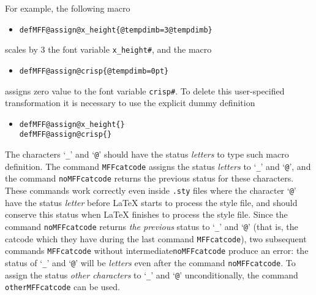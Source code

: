 For example, the following macro
\begin{itemize}
\item[] {\tt \bs{}def\bs{}MFF@assign@x\_height\{\bs{}@tempdimb=3\bs{}@tempdimb\}}
\end{itemize}
scales by 3 the font variable {\tt x\_height\#}, and the macro
\begin{itemize}
\item[] {\tt \bs{}def\bs{}MFF@assign@crisp\{\bs{}@tempdimb=0pt\}}
\end{itemize}
assigns zero value to the font variable {\tt crisp\#}.
To delete this user-specified transformation it is
necessary to use the explicit dummy definition
\begin{itemize}
\item[] {\tt \bs{}def\bs{}MFF@assign@x\_height\{\}}\\
        {\tt \bs{}def\bs{}MFF@assign@crisp\{\}}
\end{itemize}

The characters `{\tt \_}' and `{\tt @}' should have the status
{\em letters} to type such macro definition. The command
{\tt\bs{}MFFcatcode} assigns the status {\em letters} to
`{\tt \_}' and `{\tt @}', and the command {\tt\bs{}noMFFcatcode}
returns the previous status for these characters.
These commands work correctly even inside {\tt .sty} files where
the character `{\tt @}' have the status {\em letter} before \LaTeX{}
starts to process the style file, and should conserve this status
when \LaTeX{} finishes to process the style file.
Since the command {\tt\bs{}noMFFcatcode} returns {\em the previous}
status to `{\tt \_}' and `{\tt @}' (that is, the catcode which
they have during the last command {\tt\bs{}MFFcatcode}), two subsequent
commands {\tt\bs{}MFFcatcode} without intermediate{\tt\bs{}noMFFcatcode}
produce an error: the status of `{\tt \_}' and `{\tt @}' will be
{\em letters} even after the command {\tt\bs{}noMFFcatcode}.
To assign the status {\em other characters} to `{\tt \_}' and `{\tt @}'
unconditionally, the command {\tt\bs{}otherMFFcatcode} can be used.

\bigskip

